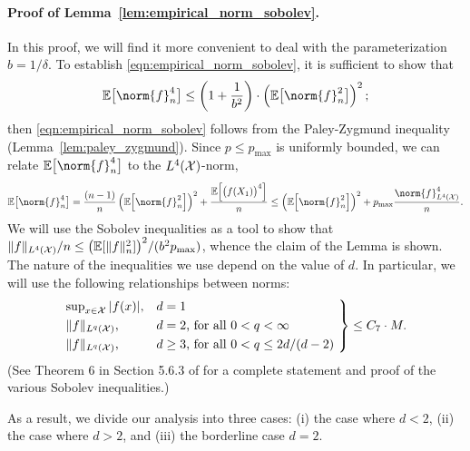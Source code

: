 \paragraph{Proof of Lemma~\ref{lem:empirical_norm_sobolev}.}
In this proof, we will find it more convenient to deal with the parameterization $b = 1/\delta$. To establish \eqref{eqn:empirical_norm_sobolev}, it is sufficient to show that
\begin{equation*}
\mathbb{E}\bigl[\norm{f}_n^4\bigr] \leq \left(1 + \frac{1}{b^2}\right)\cdot \left(\mathbb{E}\bigl[\norm{f}_n^2\bigr]\right)^2;
\end{equation*}
then \eqref{eqn:empirical_norm_sobolev} follows from the Paley-Zygmund inequality (Lemma~\ref{lem:paley_zygmund}). Since $p \leq p_{\max}$ is uniformly bounded, we can relate $\mathbb{E}\bigl[\norm{f}_n^4\bigr]$ to the $L^4(\mathcal{X})$-norm,
\begin{equation*}
\mathbb{E}\bigl[\norm{f}_n^4\bigr] = \frac{(n-1)}{n}\left(\mathbb{E}\Bigl[\norm{f}_n^2\Bigr]\right)^2 + \frac{\mathbb{E}\Bigl[\bigl(f(X_1)\bigr)^4\Bigr]}{n} \leq \left(\mathbb{E}\Bigl[\norm{f}_n^2\Bigr]\right)^2 + p_{\max}\frac{\norm{f}_{\Leb^4(\Xset)}^4}{n}.
\end{equation*}
We will use the Sobolev inequalities as a tool to show that $\|f\|_{L^4(\mathcal{X})}/n \leq \bigl(\mathbb{E}[\|f\|_n^2]\bigr)^2/(b^2p_{\max})$, whence the claim of the Lemma is shown. The nature of the inequalities we use depend on the value of $d$. In particular, we will use the following relationships between norms: 
\begin{equation*}
\begin{rcases*}
\sup_{x \in \mc{X}}|f(x)|,& \textrm{$d = 1$}\\
\|f\|_{\Leb^{q}(\mc{X})},& \textrm{$d = 2$, for all $0 < q < \infty$} \\
\|f\|_{\Leb^{q}(\mc{X})},& \textrm{$d \geq 3$, for all $0 < q \leq 2d/(d - 2)$}
\end{rcases*}
\leq C_7 \cdot M.
\end{equation*}
(See Theorem 6 in Section 5.6.3 of \citet{evans10} for a complete statement and proof of the various Sobolev inequalities.)

As a result, we divide our analysis into three cases: (i) the case where $d < 2$, (ii) the case where $d > 2$, and (iii) the borderline case $d = 2$.

